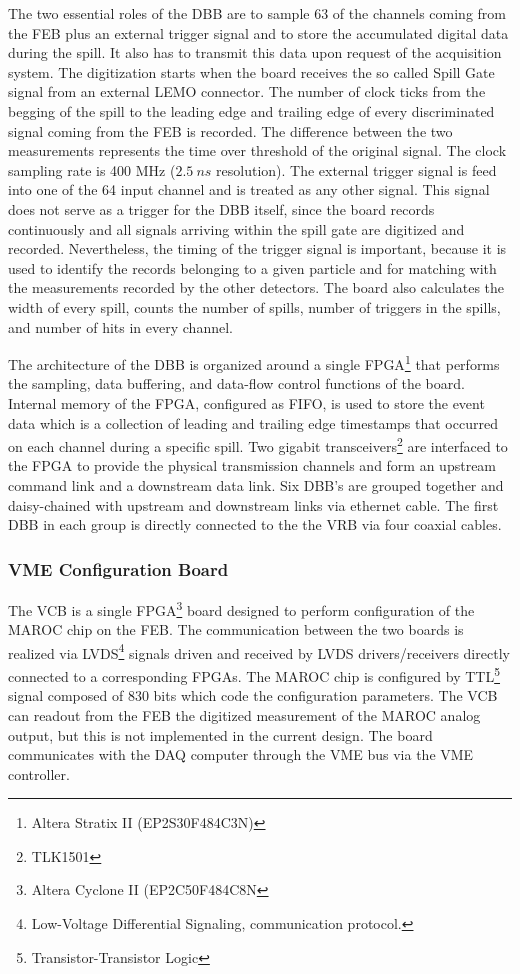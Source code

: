 \documentclass[a4paper,11pt]{article}
\begin{document}
The two essential roles of the DBB are to sample 63 of the channels coming from the FEB plus an external trigger signal and to store the accumulated
digital data during the spill. It also has to transmit this data upon request of the acquisition system. The digitization starts when the board
receives the so called Spill Gate signal from an external LEMO connector. The number of clock ticks from the begging of the spill to the leading edge
and trailing edge of every discriminated signal coming from the FEB is recorded. The difference between the two measurements represents the time over
threshold of the original signal. The clock sampling rate is 400 MHz ($2.5 \ ns$ resolution). The external trigger signal is feed into one of the
64 input channel and is treated as any other signal. This signal does not serve as a trigger for the DBB itself, since the board records continuously
and all signals arriving within the spill gate are digitized and recorded. Nevertheless, the timing of the trigger signal is important, because it is
used to identify the records belonging to a given particle and for matching with the measurements recorded by the other detectors. The board also
calculates the width of every spill, counts the number of spills, number of triggers in the spills, and number of hits in every channel.

The architecture of the DBB is organized around a single FPGA\footnote{Altera Stratix II (EP2S30F484C3N)} that performs the sampling, data
buffering, and data-flow control functions of the board. Internal memory of the FPGA, configured as FIFO, is used to store the event data which is
a collection of leading and trailing edge timestamps that occurred on each channel during a specific spill. Two gigabit transceivers\footnote{TLK1501}
are interfaced to the FPGA to provide the physical transmission channels and form an upstream command link and a downstream data link. Six DBB's are
grouped together and daisy-chained with upstream and downstream links via ethernet cable. The first DBB in each group is directly connected to the
the VRB via four coaxial cables.

\subsubsection{VME Configuration Board}
The VCB is a single FPGA\footnote{Altera Cyclone II (EP2C50F484C8N} board designed to perform configuration of the MAROC chip on the FEB. The
communication between the two boards is realized via LVDS\footnote{Low-Voltage Differential Signaling, communication protocol.} signals driven and
received by LVDS drivers/receivers directly connected to a corresponding FPGAs. The MAROC chip is configured by TTL\footnote{Transistor-Transistor
Logic} signal composed of 830 bits which code the configuration parameters. The VCB can readout from the FEB the digitized measurement of the
MAROC analog output, but this is not implemented in the current design. The board communicates with the DAQ computer through the VME bus via the
VME controller. 
\end{document}
